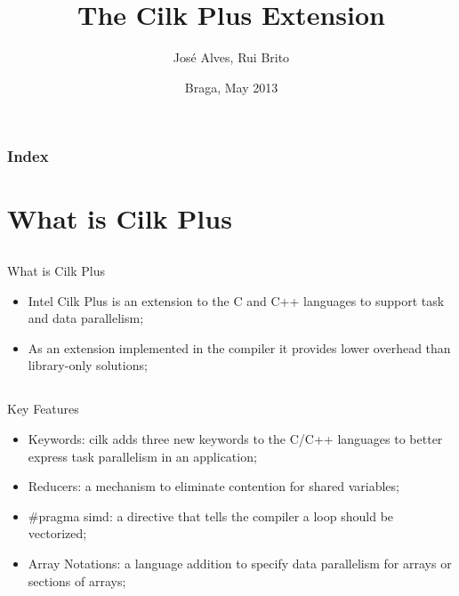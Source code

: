 \documentclass{beamer}
\title{The Cilk Plus Extension}
\author{José Alves, Rui Brito}
\institute[pg22765, pg22781]{
	Universidade do Minho
}
\date{Braga, May 2013}
\begin{document}

\maketitle%

\begin{frame}
	\frametitle{Index}
	\tableofcontents
\end{frame}


\section{What is Cilk Plus}
\subsection{}
\begin{frame}
	\begin{block}{What is Cilk Plus}
			\begin{itemize}
				\item Intel Cilk Plus is an extension to the C and C++ languages to support task and data parallelism;
				\item As an extension implemented in the compiler it provides lower overhead than library-only solutions;
			\end{itemize}		
	\end{block}
\end{frame}

\subsection{}
\begin{frame}
	\begin{block}{Key Features}
			\begin{itemize}
				\item Keywords: cilk adds three new keywords to the C/C++ languages to better express task parallelism in an application;
				\item Reducers: a mechanism to eliminate contention for shared variables;
				\item \#pragma simd: a directive that tells the compiler a loop should be vectorized;
				\item Array Notations: a language addition to specify data parallelism for arrays or sections of arrays;  				
			\end{itemize}		
	\end{block}
\end{frame}
\end{document}
